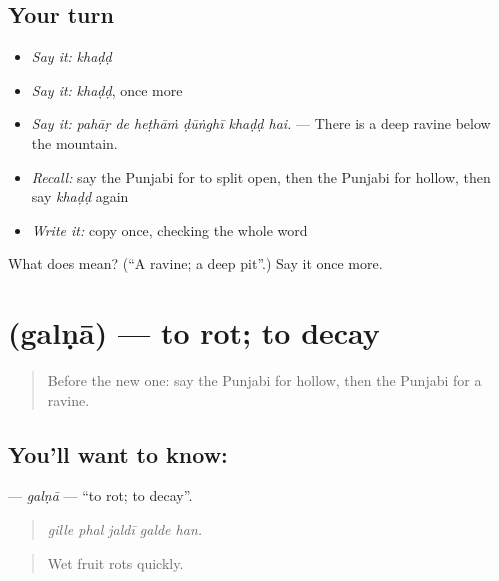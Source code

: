\subsection*{Your turn}
\begin{itemize}
\raggedright
  \item \emph{Say it:} \emph{khaḍḍ}
  \item \emph{Say it:} \emph{khaḍḍ}, once more
  \item \emph{Say it:} \emph{pahāṛ de heṭhāṁ ḍūṅghī khaḍḍ hai.} — There is a deep ravine below the mountain.
  \item \emph{Recall:} say the Punjabi for to split open, then the Punjabi for hollow, then say \emph{khaḍḍ} again
  \item \emph{Write it:} copy \textbf{} once, checking the whole word
\end{itemize}

\begin{tcolorbox}[breakable,colback=teal!4,colframe=teal!35!black,title={Before you move on}]
What does  mean? (\textquotedblleft{}A ravine; a deep pit\textquotedblright{}.) Say it once more.
\end{tcolorbox}
\section[\texorpdfstring{\pa{ਗਲਣਾ} (galṇā)}{ਗਲਣਾ (galṇā)}]{ (galṇā) — to rot; to decay}

\label{lesson:PA-C295-galna}



\begin{quote}
Before the new one: say the Punjabi for hollow, then the Punjabi for a ravine.
\end{quote}

\subsection*{You'll want to know: }
\textbf{} — \emph{galṇā} — \textquotedblleft{}to rot; to decay\textquotedblright{}.

\begin{quote}
    
\end{quote}

\begin{quote}
\emph{gille phal jaldī galde han.}
\end{quote}

\begin{quote}
Wet fruit rots quickly.
\end{quote}


